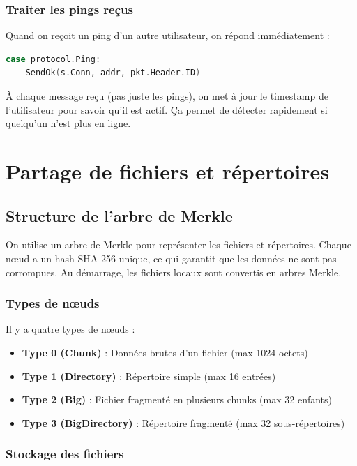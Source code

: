 \documentclass[11pt,a4paper]{report}
\begin{document}
\subsubsection{Traiter les pings reçus}

Quand on reçoit un ping d'un autre utilisateur, on répond immédiatement :

\begin{lstlisting}[language=Go]
case protocol.Ping:
    SendOk(s.Conn, addr, pkt.Header.ID)
\end{lstlisting}

À chaque message reçu (pas juste les pings), on met à jour le timestamp de l'utilisateur pour savoir qu'il est actif. Ça permet de détecter rapidement si quelqu'un n'est plus en ligne.

\section{Partage de fichiers et répertoires}

\subsection{Structure de l'arbre de Merkle}

On utilise un arbre de Merkle pour représenter les fichiers et répertoires. Chaque nœud a un hash SHA-256 unique, ce qui garantit que les données ne sont pas corrompues. Au démarrage, les fichiers locaux sont convertis en arbres Merkle.

\subsubsection{Types de nœuds}

Il y a quatre types de nœuds :

\begin{itemize}
    \item \textbf{Type 0 (Chunk)} : Données brutes d'un fichier (max 1024 octets)
    \item \textbf{Type 1 (Directory)} : Répertoire simple (max 16 entrées)
    \item \textbf{Type 2 (Big)} : Fichier fragmenté en plusieurs chunks (max 32 enfants)
    \item \textbf{Type 3 (BigDirectory)} : Répertoire fragmenté (max 32 sous-répertoires)
\end{itemize}

\subsubsection{Stockage des fichiers}
\end{document}
